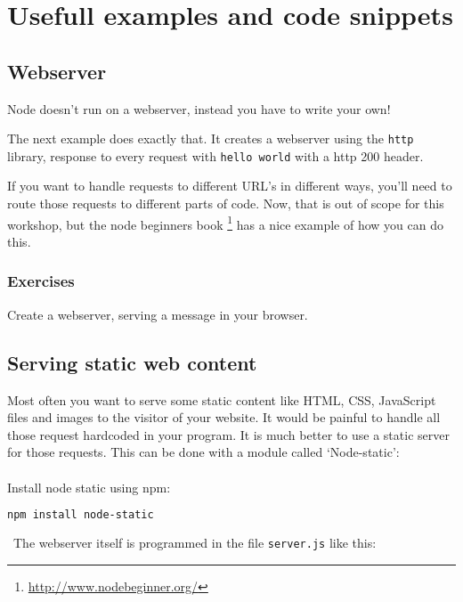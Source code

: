 \documentclass[a4paper]{report}
\begin{document}
 
 
\section*{Usefull examples and code snippets} 
 
\subsection*{Webserver} 
Node doesn't run on a webserver, instead you have to write your own! 
 
The next example does exactly that. It creates a webserver using the \texttt{http} library, response to every request with \texttt{hello world} with a http 200 header. 
 
 
 
\noindent If you want to handle requests to different URL's in different ways, you'll need to route those requests to different parts of code. Now, that is out of scope for this workshop, but the node beginners book \footnote{\url{http://www.nodebeginner.org/}} has a nice example of how you can do this. 
 
\subsubsection*{Exercises} 
Create a webserver, serving a message in your browser. 
 
\subsection*{Serving static web content} 
Most often you want to serve some static content like HTML, CSS, JavaScript files and images to the visitor of your website. It would be painful to handle all those request hardcoded in your program. It is much better to use a static server for those requests. This can be done with a module called `Node-static':\\ 
\\ 
\noindent Install node static using npm: 
\begin{lstlisting}[language=bash] 
npm install node-static 
\end{lstlisting} 
\noindent\ The webserver itself is programmed in the file \texttt{server.js} like this: 
 
 
\end{document}

